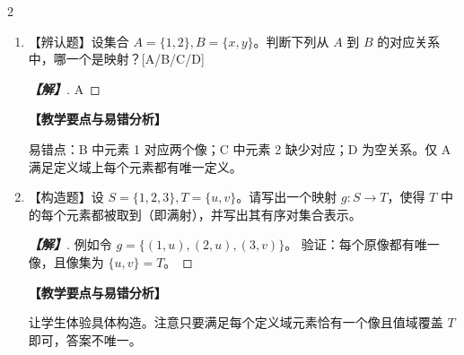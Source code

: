 \documentclass[12pt]{ctexart}
\newenvironment{solution}[1][解]{%
    \par\begingroup\color{blue!85!black}%
    \begin{proof}[\indent\bfseries\color{blue!85!black}【#1】]%
  }{%
    \end{proof}\endgroup\par
  }
\newenvironment{teacherNote}[1][教学要点与易错分析]{%
    \par\vspace{0.6ex}%
    \begingroup\color{teal!80!black}\small
    \noindent\textbf{【#1】}\par\vspace{0.2ex}%
  }{%
    \endgroup\par\vspace{0.6ex}%
  }
\newcommand{\ansspace}[1]{\par\vspace{0.4ex}}
\newcommand{\ansspace}[1]{\vspace{#1}}
\begin{document}
\begin{multicols}{2}
\begin{enumerate}[series=probchain]
\item 【辨认题】设集合 $A = \{1, 2\}, B = \{x, y\}$。判断下列从 $A$ 到 $B$ 的对应关系中，哪一个是映射？\fillin[A]{15mm}[A/B/C/D]
\ansspace{1.5cm}
\begin{solution}
A
\end{solution}
\begin{teacherNote}
易错点：B 中元素 1 对应两个像；C 中元素 2 缺少对应；D 为空关系。仅 A 满足定义域上每个元素都有唯一定义。
\end{teacherNote}

\item 【构造题】设 $S = \{1, 2, 3\}, T = \{u, v\}$。请写出一个映射 $g: S \to T$，使得 $T$ 中的每个元素都被取到（即满射），并写出其有序对集合表示。
\ansspace{3.5cm}
\begin{solution}
例如令 $g = \{(1, u), (2, u), (3, v)\}$。
验证：每个原像都有唯一像，且像集为 $\{u, v\} = T$。
\end{solution}
\begin{teacherNote}
让学生体验具体构造。注意只要满足每个定义域元素恰有一个像且值域覆盖 $T$ 即可，答案不唯一。
\end{teacherNote}


\end{enumerate}
\end{multicols}
\end{document}
